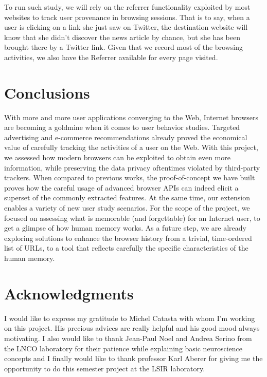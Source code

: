 \documentclass[10pt,a4paper]{article}
\begin{document}
To run such study, we will rely on the referrer functionality exploited by most websites to track user provenance in browsing sessions. That is to say, when a user is clicking on a link she just saw on Twitter, the destination website will know that she didn’t discover the news article by chance, but she has been brought there by a Twitter link. Given that we record most of the browsing activities, we also have the Referrer available for every page visited. 


\section{Conclusions}
\label{sec:conclusion}
With more and more user applications converging to the Web, Internet browsers are becoming a goldmine when it comes to user behavior studies. Targeted advertising and e-commerce recommendations already proved the economical value of carefully tracking the activities of a user on the Web. With this project, we assessed how modern browsers can be exploited to obtain even more information, while preserving the data privacy oftentimes violated by third-party trackers. When compared to previous works, the proof-of-concept we have built proves how the careful usage of advanced browser APIs can indeed elicit a superset of the commonly extracted features. At the same time, our extension enables a variety of new user study scenarios. For the scope of the project, we focused on assessing what is memorable (and forgettable) for an Internet user, to get a glimpse of how human memory works. As a future step, we are already exploring solutions to enhance the browser history from a trivial, time-ordered list of URLs, to a tool that reflects carefully the specific characteristics of the human memory.

\section*{Acknowledgments}
I would like to express my gratitude to Michel Catasta with whom I'm working on this project. His precious advices are really helpful and his good mood always motivating. I also would like to thank Jean-Paul Noel and Andrea Serino from the LNCO laboratory for their patience while explaining basic neuroscience concepts and I finally would like to thank professor Karl Aberer for giving me the opportunity to do this semester project at the LSIR laboratory.

\begin{appendix}


\end{appendix}	
\end{document}

